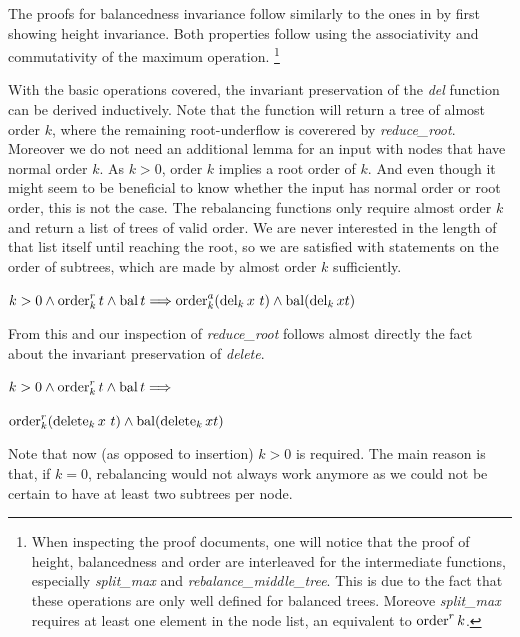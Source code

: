 The proofs for balancedness invariance follow similarly to
the ones in  by first showing height invariance.
Both properties follow using the associativity
and commutativity of the maximum operation.
\footnote{
    When inspecting the proof documents,
    one will notice that the proof of height, balancedness and order
    are interleaved for the
    intermediate functions, especially
    \textit{split\_max} and \textit{rebalance\_middle\_tree}.
    This is due to the fact that these operations
    are only well defined for balanced trees.
    Moreove \textit{split\_max} requires at least
    one element in the node list, an equivalent
    to $\operatorname{order}^r k$.
}

With the basic operations covered,
the invariant preservation of the \textit{del} function
can be derived inductively.
Note that the function will return a tree of almost order $k$,
where the remaining root-underflow is coverered by \textit{reduce\_root}.
Moreover we do not need an additional lemma
for an input with nodes that have normal order $k$.
As $k > 0$, order $k$ implies a root order of $k$.
And even though it might seem to be beneficial to know
whether the input has normal order or root order, this is not the case.
The rebalancing functions only require
almost order $k$ and return a list of trees of valid order.
We are never interested in the length of that list itself
until reaching the root, so we are satisfied with statements
on the order of subtrees,
which are made by almost order $k$ sufficiently.

\begin{lemma}
    $k > 0 \wedge \operatorname{order}^r_k t \wedge \operatorname{bal} t \Longrightarrow
    \operatorname{order}^a_k (\operatorname{del}_k x\ t) \wedge \operatorname{bal} (\operatorname{del}_k x t)$
\end{lemma}

From this and our inspection of \textit{reduce\_root}
follows almost directly the fact about the invariant
preservation of \textit{delete}.

\begin{samepage}
\begin{theorem}
    $k > 0 \wedge \operatorname{order}^r_k t \wedge \operatorname{bal} t \Longrightarrow$ \\
    \begin{center}
    $\operatorname{order}^r_k (\operatorname{delete}_k x\ t) \wedge \operatorname{bal} (\operatorname{delete}_k x t)$
    \end{center}
\end{theorem}
\end{samepage}

Note that now (as opposed to insertion) $k > 0$ is required.
The main reason is that,
if $k = 0$, rebalancing would not always work anymore
as we could not be certain to have at least two subtrees per node.

